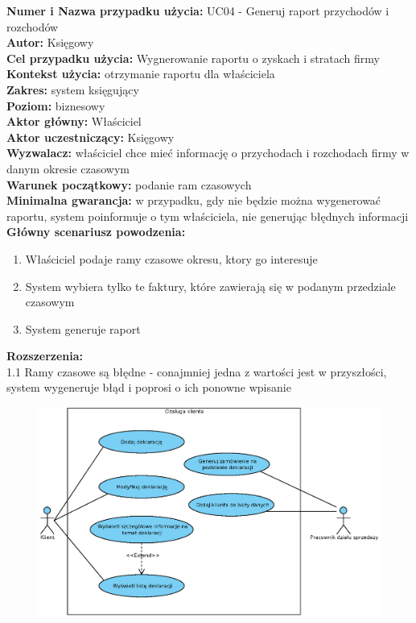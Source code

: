 \textbf{Numer i Nazwa przypadku użycia:} UC04 - Generuj raport przychodów i rozchodów \\
\textbf{Autor:} Księgowy\\
\textbf{Cel przypadku użycia:} Wygnerowanie raportu o zyskach i stratach firmy \\
\textbf{Kontekst użycia:} otrzymanie raportu dla właściciela  \\
\textbf{Zakres:} system księgujący \\
\textbf{Poziom:} biznesowy \\
\textbf{Aktor główny:} Właściciel \\
\textbf{Aktor uczestniczący:} Księgowy \\
\textbf{Wyzwalacz:} właściciel chce mieć informację o przychodach i rozchodach firmy w danym okresie czasowym \\
\textbf{Warunek początkowy:} podanie ram czasowych  \\
\textbf{Minimalna gwarancja:} w przypadku, gdy nie będzie można wygenerować raportu, system poinformuje o tym właściciela, nie generując błędnych informacji \\
\textbf{Główny scenariusz powodzenia:} 
	\begin{enumerate}
		\item Właściciel podaje ramy czasowe okresu, ktory go interesuje
		\item System wybiera tylko te faktury, które zawierają się w podanym przedziale czasowym
		\item System generuje raport
	\end{enumerate}
\textbf{Rozszerzenia:} \\
1.1 Ramy czasowe są błędne - conajmniej jedna z wartości jest w przyszłości, system wygeneruje błąd i poprosi o ich ponowne wpisanie


\begin{figure}[H]
	\centering
	\includegraphics[width=1.1\textwidth]{img/UC/deklaracje.eps}
\end{figure}